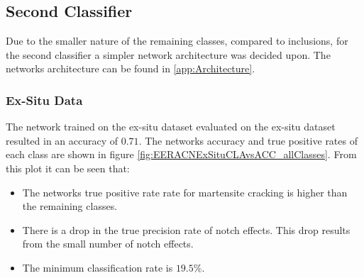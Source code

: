 \newpage
\subsection{Second Classifier}
Due to the smaller nature of the remaining classes, compared to inclusions, for the second classifier a simpler network architecture was decided upon. The networks architecture can be found in \ref{app:Architecture}.


%
%

\subsubsection{Ex-Situ Data}
The network trained on the ex-situ dataset evaluated on the ex-situ dataset resulted in an accuracy of $0.71$. The networks accuracy and true positive rates of each class are shown in figure \ref{fig:EERACNExSituCLAvsACC_allClasses}. From this plot it can be seen that:
\begin{itemize}
\item The networks true positive rate rate for martensite cracking is higher than the remaining classes.
\item There is a drop in the true precision rate of notch effects. This drop results from the small number of notch effects.
\item The minimum classification rate is $19.5\%$. 
\end{itemize}

